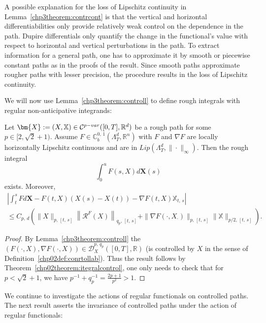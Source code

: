\documentclass[AHL,Unicode,longabstracts,published]{cedram}
\newcommand{\scrD}{\mathscr{D}}
\newcommand{\bbX}{\mathbb{X}}
\newcommand{\bbC}{\mathbb{C}}
\newcommand{\calR}{\mathcal{R}}
\newcommand{\calC}{\mathcal{C}}
\newcommand{\Rr}{{\mathbb{R}}}
\begin{document}
\begin{rema}\label{remark:Lipcontrol2}
A possible explanation for the loss of Lipschitz continuity in Lemma~\ref{chp3theorem:contrcont} is that the vertical and horizontal differentiabilities only provide relatively weak control on the dependence in the path. Dupire differentials only quantify the change in the functional's value with respect to horizontal and vertical perturbations in the path. To extract information for a general path, one has to approximate it by smooth or piecewise constant paths as in the proofs of the result. Since smooth paths approximate rougher paths with lesser precision, the procedure results in the loss of Lipschitz continuity.
\end{rema}

We will now use Lemma~\ref{chp3theorem:controll} to define rough integrals with regular non-anticipative integrands:
\begin{theo}\label{chp3theorem:roughpathint}
Let $\bm{X}:=(X, \bbX)\in\calC^{p-var}\linebreak([0,T],\Rr^d)$ be a rough path for some $p\in [2, \sqrt{2}+1)$.
Assume $F\in \bbC^{0,\,1}_b(\Lambda^d_T,\Rr^n)$ with $F$ and $ \nabla F$ are locally horizontally Lipschitz continuous and are in $Lip(\Lambda^d_T, \|\cdot\|_{\infty})$. Then the rough integral
\begin{equation}\label{chp3def.integral}
\int_0^u F(s, X)d\bm{X}(s)
\end{equation}
exists. Moreover,
\begin{multline*}
\left|\int_t^s Fd\bm{X}-F(t,X)(X(s)-X(t))-\nabla F(t,X)\bbX_{t,\,s}\right|\\
\leq
C_{p,\,d}\left(\|X\|_{p,\,[t,\,s]}\left\|\calR^{F}(X)\right\|_{q_{p},\,[t,\,s]}+\|\nabla F(\cdot,X_{\cdot})\|_{p,\,[t,\,s]}\|\bbX\|_{p/2,\,[t,\,s]}\right).
\end{multline*}
\end{theo}


\begin{proof}
By Lemma~\ref{chp3theorem:controll} the $(F(\cdot, X), \nabla F(\cdot, X))\in \scrD^{p,\,q_p}_{X}([0,T],\Rr)$ (is controlled by $X$ in the sense of Definition~\ref{chp02def:conrtollab}). Thus the result follows by Theorem~\ref{chp02theorem:itegralcontrol}, one only needs to check that for $p<\sqrt{2}+1$, we have $p^{-1}+q_p^{-1}= \frac{2p+1}{p^2}>1$.
\end{proof}



We continue to investigate the actions of regular functionals on controlled paths. The next result asserts the invariance of controlled paths under the action of regular functionals:
\end{document}
